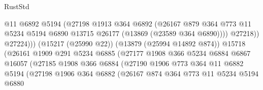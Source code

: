 \begin{lexlean}{RustStd}
\begin{coremodule}
                                        @11
                                        @6892
                                        @5194
                                        (@27198
                                          @1913
                                          @364
                                          @6892
                                          (@26167
                                            @879
                                            @364
                                            @773
                                            @11
                                            @5234
                                            @5194
                                            @6890
                                            @13715
                                            @26177
                                            (@13869 (@23589 @364 @6890))))
                                        @27218))
                                    @27224)))
                              (@15217 (@25990 @22))
                              (@13879 (@25994 @14892 @874))
                              @15718
                              (@26161
                                @1909
                                @291
                                @5234
                                @6885
                                (@27177
                                  @1908
                                  @366
                                  @5234
                                  @6884
                                  @6867
                                  @16057
                                  (@27185
                                    @1908
                                    @366
                                    @6884
                                    (@27190
                                      @1906
                                      @773
                                      @364
                                      @11
                                      @6882
                                      @5194
                                      (@27198
                                        @1906
                                        @364
                                        @6882
                                        (@26167
                                          @874
                                          @364
                                          @773
                                          @11
                                          @5234
                                          @5194
                                          @6880

\end{coremodule}
\end{lexlean}
